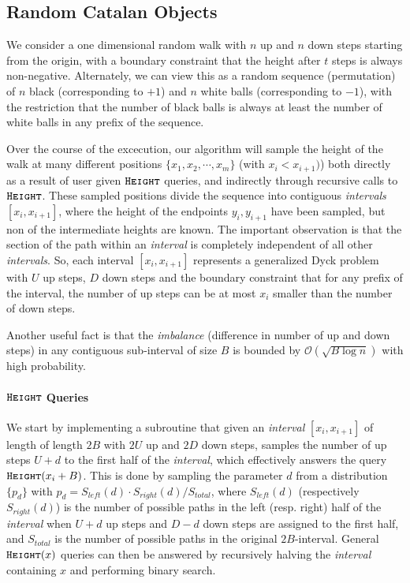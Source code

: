 \subsection{Random Catalan Objects}
\label{sec:overview_catalan_objects}
We consider a one dimensional random walk with $n$ up and $n$ down steps starting from the origin,
with a boundary constraint that the height after $t$ steps is always non-negative.
Alternately, we can view this as a random sequence (permutation) of $n$ black (corresponding to $+1$) and $n$ white balls (corresponding to $-1$),
with the restriction that the number of black balls is always at least the number of white balls in any prefix of the sequence.

Over the course of the excecution, our algorithm will sample the height of the walk at many different positions $\{ x_1, x_2,\cdots, x_m\}$
(with $x_i<x_{i+1})$) both directly as a result of user given $\texttt{\textsc{Height}}$ queries, and indirectly through recursive calls to $\texttt{\textsc{Height}}$.
These sampled positions divide the sequence into contiguous \emph{intervals} $[x_i,x_{i+1}]$,
where the height of the endpoints $y_i, y_{i+1}$ have been sampled, but non of the intermediate heights are known.
The important observation is that the section of the path within an \emph{interval} is completely independent of all other \emph{intervals}.
So, each interval $[x_i,x_{i+1}]$ represents a generalized Dyck problem with $U$ up steps, $D$ down steps and the boundary constraint that
for any prefix of the interval, the number of up steps can be at most $x_i$ smaller than the number of down steps.

Another useful fact is that the \emph{imbalance} (difference in number of up and down steps) in any contiguous sub-interval of size $B$
is bounded by $\mathcal O(\sqrt{B\log n})$ with high probability.

\paragraph*{$\texttt{\textsc{Height}}$ Queries}
\label{par:height_queries}
We start by implementing a subroutine that given an \emph{interval} $[x_i,x_{i+1}]$ of length of length $2B$ with $2U$ up and $2D$ down steps,
samples the number of up steps $U+d$ to the first half of the \emph{interval}, which effectively answers the query $\texttt{\textsc{Height}}(x_i+B)$.
This is done by sampling the parameter $d$ from a distribution $\{ p_d\}$ with $p_d = S_{left}(d)\cdot S_{right}(d)/S_{total}$,
where $S_{left}(d)$ (respectively $S_{right}(d)$) is the number of possible paths in the left (resp. right) half of the \emph{interval} when
$U+d$ up steps and $D-d$ down steps are assigned to the first half, and $S_{total}$ is the number of possible paths in the original $2B$-interval.
General $\texttt{\textsc{Height}}(x)$ queries can then be answered by recursively halving the \emph{interval} containing $x$ and performing binary search.

